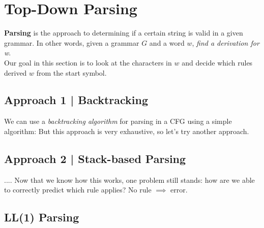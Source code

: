 \documentclass{report}
\begin{document}
\section{Top-Down Parsing}
\textbf{Parsing} is the approach to determining if a certain string is valid in a given grammar. In other words, given a grammar $G$ and a word $w$, \textit{find a derivation for w}.\\
Our goal in this section is to look at the characters in $w$ and decide which rules derived $w$ from the start symbol.
\subsection{Approach 1 | Backtracking}
We can use a \textit{backtracking algorithm} for parsing in a CFG using a simple algorithm:
But this approach is very exhaustive, so let's try another approach.
\subsection{Approach 2 | Stack-based Parsing}
....
Now that we know how this works, one problem still stands: how are we able to correctly predict which rule applies?
No rule $\implies$ error.
\subsection{LL(1) Parsing}

\end{document}
